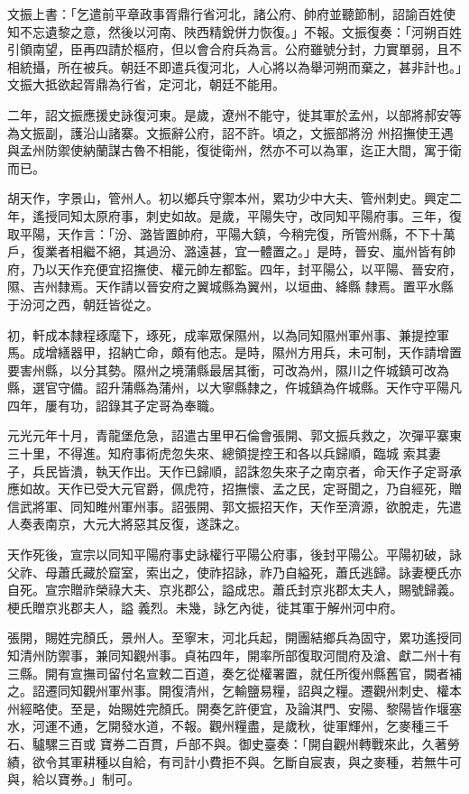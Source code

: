 \begin{pinyinscope}
 文振上書：「乞遣前平章政事胥鼎行省河北，諸公府、帥府並聽節制，詔諭百姓使知不忘遺黎之意，然後以河南、陜西精銳併力恢復。」不報。文振復奏：「河朔百姓引領南望，臣再四請於樞府，但以會合府兵為言。公府雖號分封，力實單弱，且不相統攝，所在被兵。朝廷不即遣兵復河北，人心將以為舉河朔而棄之，甚非計也。」文振大抵欲起胥鼎為行省，定河北，朝廷不能用。



 二年，詔文振應援史詠復河東。是歲，遼州不能守，徙其軍於孟州，以部將郝安等為文振副，護沿山諸寨。文振辭公府，詔不許。頃之，文振部將汾
 州招撫使王遇與孟州防禦使納蘭謀古魯不相能，復徙衛州，然亦不可以為軍，迄正大間，寓于衛而已。



 胡天作，字景山，管州人。初以鄉兵守禦本州，累功少中大夫、管州刺史。興定二年，遙授同知太原府事，刺史如故。是歲，平陽失守，改同知平陽府事。三年，復取平陽，天作言：「汾、潞皆置帥府，平陽大鎮，今稍完復，所管州縣，不下十萬戶，復業者相繼不絕，其過汾、潞遠甚，宜一體置之。」是時，晉安、嵐州皆有帥府，乃以天作充便宜招撫使、權元帥左都監。四年，封平陽公，以平陽、晉安府，隰、吉州隸焉。天作請以晉安府之翼城縣為翼州，以垣曲、絳縣
 隸焉。置平水縣于汾河之西，朝廷皆從之。



 初，軒成本隸程琢麾下，琢死，成率眾保隰州，以為同知隰州軍州事、兼提控軍馬。成增繕器甲，招納亡命，頗有他志。是時，隰州方用兵，未可制，天作請增置要害州縣，以分其勢。隰州之境蒲縣最居其衝，可改為州，隰川之仵城鎮可改為縣，選官守備。詔升蒲縣為蒲州，以大寧縣隸之，仵城鎮為仵城縣。天作守平陽凡四年，屢有功，詔錄其子定哥為奉職。



 元光元年十月，青龍堡危急，詔遣古里甲石倫會張開、郭文振兵救之，次彈平寨東三十里，不得進。知府事術虎忽失來、總領提控王和各以兵歸順，臨城
 索其妻子，兵民皆潰，執天作出。天作已歸順，詔誅忽失來子之南京者，命天作子定哥承應如故。天作已受大元官爵，佩虎符，招撫懷、孟之民，定哥聞之，乃自經死，贈信武將軍、同知睢州軍州事。詔張開、郭文振招天作，天作至濟源，欲脫走，先遣人奏表南京，大元大將惡其反復，遂誅之。



 天作死後，宣宗以同知平陽府事史詠權行平陽公府事，後封平陽公。平陽初破，詠父祚、母蕭氏藏於窟室，索出之，使祚招詠，祚乃自縊死，蕭氏逃歸。詠妻梗氏亦自死。宣宗贈祚榮祿大夫、京兆郡公，謚成忠。蕭氏封京兆郡太夫人，賜號歸義。梗氏贈京兆郡夫人，謚
 義烈。未幾，詠乞內徙，徙其軍于解州河中府。



 張開，賜姓完顏氏，景州人。至寧末，河北兵起，開團結鄉兵為固守，累功遙授同知清州防禦事，兼同知觀州事。貞祐四年，開率所部復取河間府及滄、獻二州十有三縣。開有宣撫司留付名宣敕二百道，奏乞從權署置，就任所復州縣舊官，闕者補之。詔遷同知觀州軍州事。開復清州，乞輸鹽易糧，詔與之糧。遷觀州刺史、權本州經略使。至是，始賜姓完顏氏。開奏乞許便宜，及論淇門、安陽、黎陽皆作堰塞水，河運不通，乞開發水道，不報。觀州糧盡，是歲秋，徙軍輝州，乞麥種三千石、驢騾三百或
 寶券二百貫，戶部不與。御史臺奏：「開自觀州轉戰來此，久著勞績，欲令其軍耕種以自給，有司計小費拒不與。乞斷自宸衷，與之麥種，若無牛可與，給以寶券。」制可。



\end{pinyinscope}
